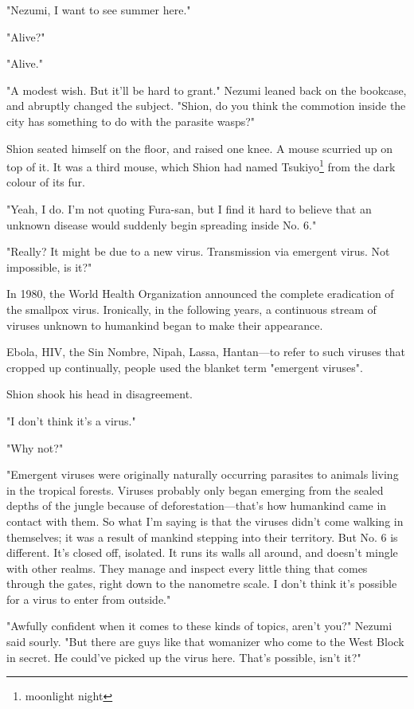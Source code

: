 "Nezumi, I want to see summer here."

"Alive?"

"Alive."

"A modest wish. But it'll be hard to grant." Nezumi leaned back on the
bookcase, and abruptly changed the subject. "Shion, do you think the
commotion inside the city has something to do with the parasite wasps?"

Shion seated himself on the floor, and raised one knee. A mouse scurried
up on top of it. It was a third mouse, which Shion had named Tsukiyo\footnote{moonlight night}
from the dark colour of its fur.

"Yeah, I do. I'm not quoting Fura-san, but I find it hard to believe
that an unknown disease would suddenly begin spreading inside No. 6."

"Really? It might be due to a new virus. Transmission via emergent
virus. Not impossible, is it?"

In 1980, the World Health Organization announced the complete
eradication of the smallpox virus. Ironically, in the following years, a
continuous stream of viruses unknown to humankind began to make their
appearance.

Ebola, HIV, the Sin Nombre, Nipah, Lassa, Hantan---to refer to such
viruses that cropped up continually, people used the blanket term
"emergent viruses".

Shion shook his head in disagreement.

"I don't think it's a virus."

"Why not?"

"Emergent viruses were originally naturally occurring parasites to
animals living in the tropical forests. Viruses probably only began
emerging from the sealed depths of the jungle because of
deforestation---that's how humankind came in contact with them. So what
I'm saying is that the viruses didn't come walking in themselves; it was
a result of mankind stepping into their territory. But No. 6 is
different. It's closed off, isolated. It runs its walls all around, and
doesn't mingle with other realms. They manage and inspect every little
thing that comes through the gates, right down to the nanometre scale. I
don't think it's possible for a virus to enter from outside."

"Awfully confident when it comes to these kinds of topics, aren't you?"
Nezumi said sourly. "But there are guys like that womanizer who come to
the West Block in secret. He could've picked up the virus here. That's
possible, isn't it?"

